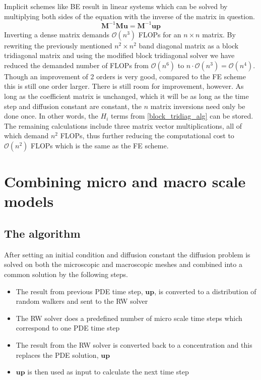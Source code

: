 Implicit schemes like BE result in linear systems which can be solved by multiplying both sides of the equation with the inverse of the matrix in question. 
\begin{equation*}
 \mathbf M^{-1}\mathbf M\mathbf u = \mathbf{M}^{-1}\mathbf{up}
\end{equation*}
Inverting a dense matrix demands $\mathcal O(n^3)$ FLOPs for an $n\times n$ matrix. 
By rewriting the previously mentioned $n^2\times n^2$ band diagonal matrix as a block tridiagonal matrix and using the modified block tridiagonal solver we have reduced the demanded number of FLOPs from $\mathcal{O}(n^6)$ to $n\cdot\mathcal{O}(n^3) = \mathcal{O}(n^4)$. 
Though an improvement of 2 orders is very good, compared to the FE scheme this is still one order larger.
There is still room for improvement, however. 
As long as the coefficient matrix is unchanged, which it will be as long as the time step and diffusion constant are constant, the $n$ matrix inversions need only be done once. 
In other words, the $H_i$ terms from \eqref{block_tridiag_alg} can be stored. 
The remaining calculations include three matrix vector multiplications, all of which demand $n^2$ FLOPs, thus further reducing the computational cost to $\mathcal{O}(n^2)$ FLOPs which is the same as the FE scheme.

\section{Combining micro and macro scale models}

\subsection{The algorithm}
After setting an initial condition and diffusion constant the diffusion problem is solved on both the microscopic and macroscopic meshes and combined into a common solution by the following steps.
\begin{itemize}
 \item The result from previous PDE time step, $\mathbf{up}$, is converted to a distribution of random walkers and sent to the RW solver
 \item The RW solver does a predefined number of micro scale time steps which correspond to one PDE time step
 \item The result from the RW solver is converted back to a concentration and this replaces the PDE solution, $\mathbf{up}$
 \item $\mathbf{up}$ is then used as input to calculate the next time step
\end{itemize}

